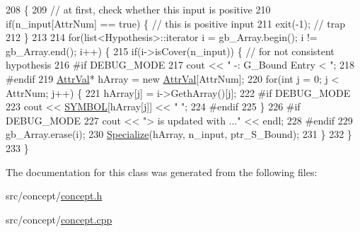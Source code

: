 \begin{DoxyCode}
208                                                           \{
209     \textcolor{comment}{// at first, check whether this input is positive}
210     \textcolor{keywordflow}{if}(n\_input[AttrNum] == \textcolor{keyword}{true}) \{  \textcolor{comment}{// this is positive input}
211     exit(-1);           \textcolor{comment}{// trap}
212     \}
213     
214     \textcolor{keywordflow}{for}(list<Hypothesis>::iterator i = gb\_Array.begin(); i != gb\_Array.end(); i++) \{
215     \textcolor{keywordflow}{if}(i->isCover(n\_input)) \{  \textcolor{comment}{// for not consistent hypothesis}
216 \textcolor{preprocessor}{#if DEBUG\_MODE}
217 \textcolor{preprocessor}{}        cout << \textcolor{stringliteral}{" -: G\_Bound Entry < "};
218 \textcolor{preprocessor}{#endif}
219 \textcolor{preprocessor}{}        \hyperlink{concept_8h_a9680d29b8d997e4adbf99481b65e897d}{AttrVal}* hArray = \textcolor{keyword}{new} \hyperlink{concept_8h_a9680d29b8d997e4adbf99481b65e897d}{AttrVal}[AttrNum];
220         \textcolor{keywordflow}{for}(\textcolor{keywordtype}{int} j = 0; j < AttrNum; j++) \{
221         hArray[j] = i->GethArray()[j];
222 \textcolor{preprocessor}{#if DEBUG\_MODE}
223 \textcolor{preprocessor}{}        cout << \hyperlink{concept_8cpp_a6a0fcd5aed2dc21ce5f79cbe7c3a8e2f}{SYMBOL}[hArray[j]] << \textcolor{stringliteral}{" "};
224 \textcolor{preprocessor}{#endif      }
225 \textcolor{preprocessor}{}        \}
226 \textcolor{preprocessor}{#if DEBUG\_MODE}
227 \textcolor{preprocessor}{}        cout << \textcolor{stringliteral}{"> is updated with ..."} << endl;
228 \textcolor{preprocessor}{#endif}
229 \textcolor{preprocessor}{}        gb\_Array.erase(i);
230         \hyperlink{class_g___bound_a28f2ef635a7a74db831df0f2da088181}{Specialize}(hArray, n\_input, ptr\_S\_Bound);
231     \}
232     \}
233 \}
\end{DoxyCode}


The documentation for this class was generated from the following files\-:\begin{DoxyCompactItemize}
\item 
src/concept/\hyperlink{concept_8h}{concept.\-h}\item 
src/concept/\hyperlink{concept_8cpp}{concept.\-cpp}\end{DoxyCompactItemize}
